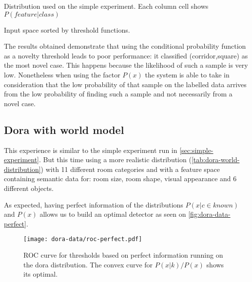 \documentclass[a4paper]{article}
\begin{document}
\begin{table}[hb]
\begin{center}

\end{center}
\caption{\label{tab:simple-distribution}Distribution used on the simple experiment. Each column cell shows $P(feature|class)$}
\end{table}

\begin{table}
\centering
{}
\qquad
{}
\caption{\label{tab:simple-data-sorted}Input space sorted by threshold functions.}
\end{table}

The results obtained demonstrate that using the conditional probability function
as a novelty threshold leads to poor performance: it classified (corridor,square) as
the most novel case.
This happens because the likelihood of such a sample is very low.
Nonetheless when using the factor $P(x)$ the system is able to take in consideration
that the low probability of that sample on the labelled data arrives from the low
probability of finding such a sample and not necessarily from a novel case.


\clearpage
\subsection{Dora with world model}
\label{sec:dora-experiment}



This experience is similar to the simple experiment run in \autoref{sec:simple-experiment}.
But this time using a more realistic distribution (\autoref{tab:dora-world-distribution}) with
11 different room categories and with a feature space containing semantic data for:
room size, room shape, visual appearance and 6 different objects.

As expected, having perfect information of the distributions $P(x|c \in known)$ and $P(x)$
allows us to build an optimal detector as seen on \autoref{fig:dora-data-perfect}.

\begin{figure}[h]
\centering
\texttt{[image: dora-data/roc-perfect.pdf]}
\caption{ROC curve for thresholds based on perfect information running on the dora distribution.
         The convex curve for $P(x|k)/P(x)$ shows its optimal.}
\label{fig:dora-data-perfect}
\end{figure}
\end{document}
